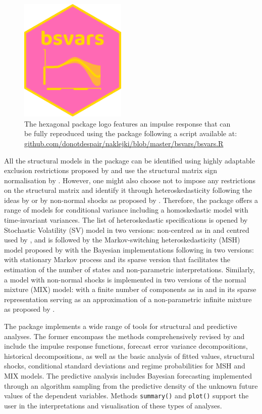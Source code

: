 \documentclass[
  nojss]{jss}
\begin{document}
\begin{figure}
\centering
\includegraphics[width=2in,height=2.314in]{bsvars.png}
\caption{The hexagonal package logo features an impulse response that
can be fully reproduced using the  package following a
script available at:
\href{https://github.com/donotdespair/naklejki/blob/master/bsvars/bsvars.R}{github.com/donotdespair/naklejki/blob/master/bsvars/bsvars.R}}
\end{figure}

All the structural models in the  package can be identified
using highly adaptable exclusion restrictions proposed by
\cite{WaggonerZha2003} and use the structural matrix sign normalisation
by \cite{WaggonerZha2003norm}. However, one might also choose not to
impose any restrictions on the structural matrix and identify it through
heteroskedasticity following the ideas by \cite{Rigobon03} or by
non-normal shocks as proposed by \cite{Lanne2010}. Therefore, the
package offers a range of models for conditional variance including a
homoskedastic model with time-invariant variances. The list of
heteroskedastic specifications is opened by Stochastic Volatility (SV)
model in two versions: non-centred as in \cite{LSUW2024} and centred
used by \cite{chankoopyu2024}, and is followed by the Markov-switching
heteroskedasticity (MSH) model proposed by \cite{brunnermeier2021} with
the Bayesian implementations following \cite{Wozniak2015} in two
versions: with stationary Markov process and its sparse version that
facilitates the estimation of the number of states and non-parametric
interpretations. Similarly, a model with non-normal shocks is
implemented in two versions of the normal mixture (MIX) model: with a
finite number of components as in \cite{FruhwirthSchnatter2006} and in
its sparse representation serving as an approximation of a
non-parametric infinite mixture as proposed by \cite{malsiner2016model}.

The  package  implements a wide range of tools
for structural and predictive analyses. The former encompass the methods
comprehensively revised by \citep[][Chapter 4: SVAR Tools]{KL2017} and
include the impulse response functions, forecast error variance
decompositions, historical decompositions, as well as the basic analysis
of fitted values, structural shocks, conditional standard deviations and
regime probabilities for MSH and MIX models. The predictive analysis
includes Bayesian forecasting implemented through an algorithm sampling
from the predictive density of the unknown future values of the
dependent variables. Methods \texttt{summary()} and \texttt{plot()}
support the user in the interpretations and visualisation of these types
of analyses.
\end{document}
